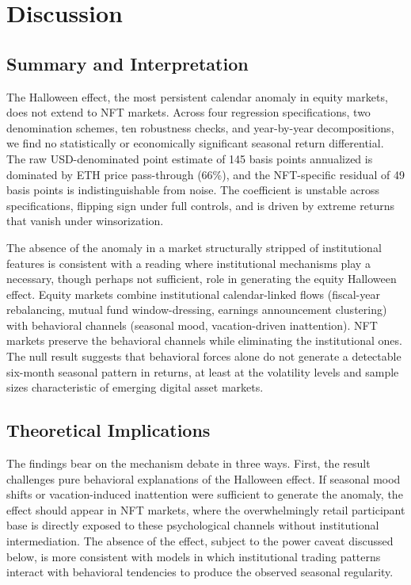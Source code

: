 \documentclass[12pt,a4paper]{article}
\begin{document}

\section{Discussion}\label{sec:discussion}

\subsection{Summary and Interpretation}

The Halloween effect, the most persistent calendar anomaly in equity markets, does not extend to NFT markets. Across four regression specifications, two denomination schemes, ten robustness checks, and year-by-year decompositions, we find no statistically or economically significant seasonal return differential. The raw USD-denominated point estimate of 145 basis points annualized is dominated by ETH price pass-through (66\%), and the NFT-specific residual of 49 basis points is indistinguishable from noise. The coefficient is unstable across specifications, flipping sign under full controls, and is driven by extreme returns that vanish under winsorization.

The absence of the anomaly in a market structurally stripped of institutional features is consistent with a reading where institutional mechanisms play a necessary, though perhaps not sufficient, role in generating the equity Halloween effect. Equity markets combine institutional calendar-linked flows (fiscal-year rebalancing, mutual fund window-dressing, earnings announcement clustering) with behavioral channels (seasonal mood, vacation-driven inattention). NFT markets preserve the behavioral channels while eliminating the institutional ones. The null result suggests that behavioral forces alone do not generate a detectable six-month seasonal pattern in returns, at least at the volatility levels and sample sizes characteristic of emerging digital asset markets.

\subsection{Theoretical Implications}

The findings bear on the mechanism debate in three ways. First, the result challenges pure behavioral explanations of the Halloween effect. If seasonal mood shifts \citep{KamstraKramerLevi2003} or vacation-induced inattention \citep{HongYu2009} were sufficient to generate the anomaly, the effect should appear in NFT markets, where the overwhelmingly retail participant base is directly exposed to these psychological channels without institutional intermediation. The absence of the effect, subject to the power caveat discussed below, is more consistent with models in which institutional trading patterns interact with behavioral tendencies to produce the observed seasonal regularity.
\end{document}
